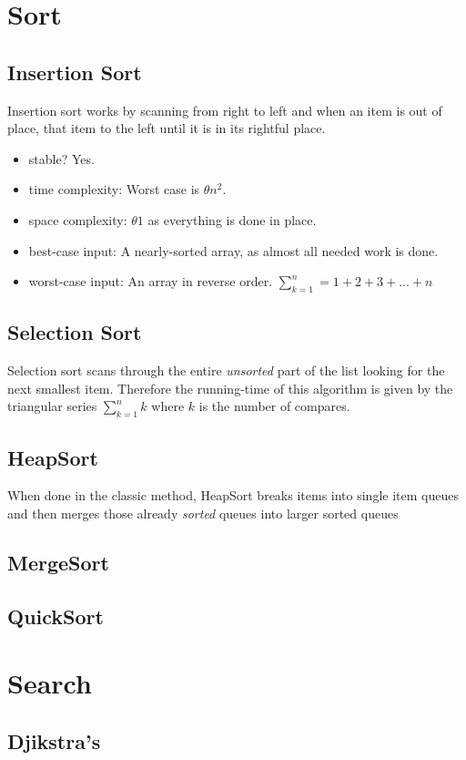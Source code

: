 \documentclass[12pt, letterpaper]{article}
\begin{document}
\setcounter{section}{-1}
\section{Sort}
\subsection{Insertion Sort}
Insertion sort works by scanning from right to left and when an item is out of place,  that item to the left until it is in its rightful place.
\begin{itemize}
\item stable? Yes.
\item time complexity:
Worst case is $\theta n^2$.
\item space complexity: 
$\theta 1$ as everything is done in place.
\item best-case input:
A nearly-sorted array, as almost all needed work is done. 
\item worst-case input: An array in reverse order. $\sum_{k=1}^{n} = 1 + 2 + 3 + ... + n$
\end{itemize}
\subsection{Selection Sort}
Selection sort scans through the entire \emph{unsorted} part of the list looking for the next smallest item. Therefore the running-time of this algorithm is given by the triangular series $\sum_{k=1}^n k$ where $k$ is the number of compares.

\subsection{HeapSort}
When done in the classic  method, HeapSort breaks items into single item queues and then merges those already \textit{sorted} queues into larger sorted queues
\subsection{MergeSort}
\subsection{QuickSort}
\section{Search}
\subsection{Djikstra's}
\end{document}
